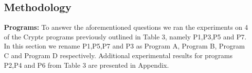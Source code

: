 \subsection{Methodology} 
\textbf{Programs:}
To answer the aforementioned questions we ran the experiments on 4 of the Crypt$\epsilon$ programs previously outlined in Table 3, namely P1,P3,P5 and P7. In this section we rename P1,P5,P7 and P3 as Program A, Program B, Program C and Program D respectively.  %
Additional experimental results for programs P2,P4 and P6 from Table 3 are presented in Appendix.%
